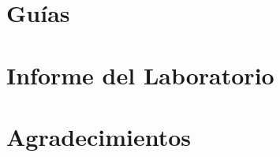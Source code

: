 \section{Guías}
\label{xss:sec:guidelines}





\section{Informe del Laboratorio}




\section*{Agradecimientos}





